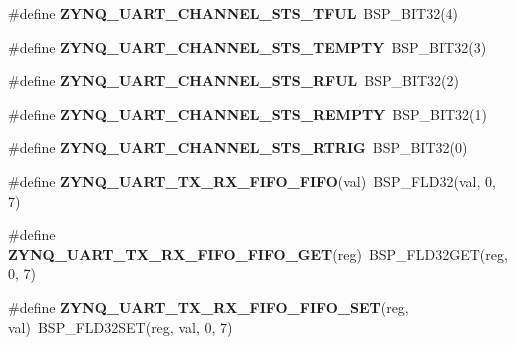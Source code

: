 \begin{DoxyCompactItemize}
\#define {\bfseries Z\+Y\+N\+Q\+\_\+\+U\+A\+R\+T\+\_\+\+C\+H\+A\+N\+N\+E\+L\+\_\+\+S\+T\+S\+\_\+\+T\+F\+UL}~B\+S\+P\+\_\+\+B\+I\+T32(4)
\item 
\mbox{\label{zynq-uart-regs_8h_a1a549779c0078be856f16bd8b451ae37}} 
\#define {\bfseries Z\+Y\+N\+Q\+\_\+\+U\+A\+R\+T\+\_\+\+C\+H\+A\+N\+N\+E\+L\+\_\+\+S\+T\+S\+\_\+\+T\+E\+M\+P\+TY}~B\+S\+P\+\_\+\+B\+I\+T32(3)
\item 
\mbox{\label{zynq-uart-regs_8h_abcc621a1b33824ab1ab3928475da6b09}} 
\#define {\bfseries Z\+Y\+N\+Q\+\_\+\+U\+A\+R\+T\+\_\+\+C\+H\+A\+N\+N\+E\+L\+\_\+\+S\+T\+S\+\_\+\+R\+F\+UL}~B\+S\+P\+\_\+\+B\+I\+T32(2)
\item 
\mbox{\label{zynq-uart-regs_8h_a3458d4134641cbab81dd3ab17644388d}} 
\#define {\bfseries Z\+Y\+N\+Q\+\_\+\+U\+A\+R\+T\+\_\+\+C\+H\+A\+N\+N\+E\+L\+\_\+\+S\+T\+S\+\_\+\+R\+E\+M\+P\+TY}~B\+S\+P\+\_\+\+B\+I\+T32(1)
\item 
\mbox{\label{zynq-uart-regs_8h_ab137bca205e7293959bf94f81f90f1ef}} 
\#define {\bfseries Z\+Y\+N\+Q\+\_\+\+U\+A\+R\+T\+\_\+\+C\+H\+A\+N\+N\+E\+L\+\_\+\+S\+T\+S\+\_\+\+R\+T\+R\+IG}~B\+S\+P\+\_\+\+B\+I\+T32(0)
\item 
\mbox{\label{zynq-uart-regs_8h_a5b0731862b7803b0c7c74613145164c6}} 
\#define {\bfseries Z\+Y\+N\+Q\+\_\+\+U\+A\+R\+T\+\_\+\+T\+X\+\_\+\+R\+X\+\_\+\+F\+I\+F\+O\+\_\+\+F\+I\+FO}(val)~B\+S\+P\+\_\+\+F\+L\+D32(val, 0, 7)
\item 
\mbox{\label{zynq-uart-regs_8h_ac2e08492e393e4cf97c50027ffc30973}} 
\#define {\bfseries Z\+Y\+N\+Q\+\_\+\+U\+A\+R\+T\+\_\+\+T\+X\+\_\+\+R\+X\+\_\+\+F\+I\+F\+O\+\_\+\+F\+I\+F\+O\+\_\+\+G\+ET}(reg)~B\+S\+P\+\_\+\+F\+L\+D32\+G\+ET(reg, 0, 7)
\item 
\mbox{\label{zynq-uart-regs_8h_a124fab1bf19bd8f87ca9305508666de5}} 
\#define {\bfseries Z\+Y\+N\+Q\+\_\+\+U\+A\+R\+T\+\_\+\+T\+X\+\_\+\+R\+X\+\_\+\+F\+I\+F\+O\+\_\+\+F\+I\+F\+O\+\_\+\+S\+ET}(reg,  val)~B\+S\+P\+\_\+\+F\+L\+D32\+S\+ET(reg, val, 0, 7)
\item 
\mbox{\label{zynq-uart-regs_8h_a058dafd4cac0f016adc54696036002af}} 

\end{DoxyCompactItemize}
